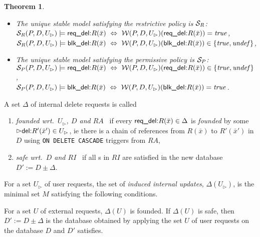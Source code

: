 \documentclass[twoside,11pt]{article}
\newtheorem{Theorem}{Theorem}
\theoremstyle{plain}
\def\rdel{\itorsf{req\_del:}}
\def\bdel{\itorsf{blk\_del:}}
\begin{document}
\begin{Theorem}\label{theo:AreStableModels}
\begin{itemize}
\item
  The unique stable model satisfying the restrictive policy is $\mathcal S_R$: \\
  $\pl S_R(P,D,U_\rhd) \models \rdel R(\bar x) \Iff
   \pl W(P,D,U_\rhd)(\rdel R(\bar x)) = \true$, \\
  $\pl S_R(P,D,U_\rhd) \models \bdel R(\bar x) \Iff
   \pl W(P,D,U_\rhd)(\bdel R(\bar x)) \in \{\true,\undef\}$,
\item
  The unique stable model satisfying the permissive policy is $\mathcal S_P$: \\
  $\pl S_P(P,D,U_\rhd) \models \rdel R(\bar x) \Iff
   \pl W(P,D,U_\rhd)(\rdel R(\bar x)) \in \{\true,\undef\}$, \\
  $\pl S_P(P,D,U_\rhd) \models \bdel R(\bar x) \Iff
   \pl W(P,D,U_\rhd)(\bdel R(\bar x)) = \true$.
\end{itemize}
\end{Theorem}

\begin{Definition}
  A set $\Delta$ of internal delete requests is called
  \begin{enumerate}
  \item \emph{founded wrt.\ $U_\rhd$, $D$ and $RA$}~
    if every $\rdel R(\bar x)\in \Delta$ is \emph{founded} by some 
    $\extev \del R'(\bar x') \in U_\rhd$, ie there is a chain of
    references from $R(\bar x)$ to $R'(\bar x')$ in $D$ using
    \texttt{ON DELETE CASCADE} triggers from $RA$,
  \item \emph{safe wrt.\ $D$ and $RI$}~ if
    all \ric s in $RI$ are satisfied in the new database 
    $D':=D \pm \Delta$.
  \end{enumerate}
  For a set $U_\rhd$ of user requests, the set of \emph{induced
  internal updates}, $\Delta(U_\rhd)$, is the minimal set $M$
  satisfying the following conditions.

\end{Definition}

\begin{Lemma}
  For a set $U$ of external requests, $\Delta(U)$ is founded. If 
  $\Delta(U)$ is safe, then $D' := D \pm \Delta$ is the database
  obtained by applying the set $U$ of user requests on the database
  $D$ and $D'$ satisfies.
\end{Lemma}
\end{document}
